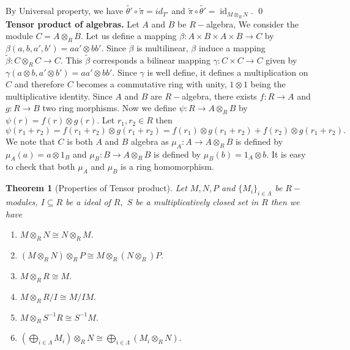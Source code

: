 \documentclass[11pt]{amsart}
\newtheorem{theorem}{Theorem}[section]
\DeclareMathOperator{\id}{\text{id}}
\begin{document}
By Universal property, we have $\tilde{\theta'}\circ \tilde{\pi}=id_{T'}$ and $\tilde{\pi}\circ \tilde{\theta'}=\id_{M\otimes_R N}.$ \qed\\

\textbf{Tensor product of algebras.} Let $A$ and $B$ be $R-$algebra, We consider the module $C=A\otimes_R B$. Let us define a mapping $\beta:A\times B\times A\times B\to C$ by $\beta(a,b,a',b')=aa'\otimes bb'.$ Since $\beta$ is multilinear, $\beta$ induce a mapping $\tilde{\beta}:C\otimes_R C\to C$. This $\tilde{\beta}$ corresponds a bilinear mapping $\gamma:C\times C\to C$ given by $\gamma(a\otimes b,a'\otimes b')=aa'\otimes bb'.$ Since $\gamma$ is well define, it defines a multiplication on $C$ and therefore $C$ becomes a commutative ring with unity, $1\otimes 1$ being the multiplicative identity. Since $A$ and $B$ are $R-$algebra, there exists $f:R\to A$ and $g:R\to B$ two ring morphisms. Now we define $\psi:R\to A\otimes_R B$ by $\psi(r)=f(r)\otimes g(r).$ Let $r_1,r_2\in R$ then $\psi(r_1+r_2)=f(r_1+r_2)\otimes g(r_1+r_2)=f(r_1)\otimes g(r_1+r_2)+f(r_2)\otimes g(r_1+r_2).$\\



We note that $C$ is both $A$ and $B$ algebra as $\mu_A:A\to A\otimes_R B$ is defined by $\mu_A(a)=a\otimes 1_B$ and $\mu_B:B\to A\otimes_R B$ is defined by $\mu_B(b)=1_A\otimes b.$ It is easy to check that both $\mu_A$ and $\mu_B$ is a ring homomorphism.

\begin{theorem}[Properties of Tensor product]

Let $M,N,P$ and $\{M_i\}_{i\in\Lambda}$ be $R-$modules, $I\subseteq R$ be a ideal of $R,$ $S$ be a multiplicatively closed set in $R$ then we have
\begin{enumerate}

\item $M\otimes_R N\cong N\otimes_R M.$

\item $(M\otimes_R N)\otimes_R P\cong M\otimes_R(N\otimes_R) P.$

\item $M\otimes_R R\cong M.$

\item $M\otimes_R R/I \cong M/IM.$

\item $M\otimes_R S^{-1}R\cong S^{-1}M.$

\item $\left(\displaystyle\bigoplus_{i\in\Lambda} M_i\right) \otimes_R N\cong \displaystyle\bigoplus_{i\in\Lambda} (M_i\otimes_R N).$

\end{enumerate}

\end{theorem}
\end{document}
